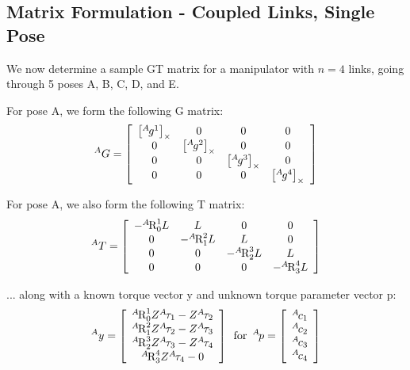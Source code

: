 \documentclass[letterpaper,12pt]{article}
\newcommand{\R}[2]{{\mbox{R}}^{#1}_{#2}}
\newcommand{\p}[1]{{}^{#1}\hspace{-.1em}}
\newcommand{\onevec}[1]
   {\left[ \begin{array}{c} #1 \end{array} \right] }
\begin{document}
   \newpage  
   \subsection{Matrix Formulation - Coupled Links, Single Pose}
   
      We now determine a sample GT matrix for a manipulator with $n=4$
      links, going through 5 poses A, B, C, D, and E.
      
      For pose A, we form the following G matrix:
      \begin{equation}
         {}^AG =
         \left[ \begin{array}{cccc}
            \left[ \p{A}g^1 \right]_{\times} & 0 & 0 & 0 \\
            0 & \left[ \p{A}g^2 \right]_{\times} & 0 & 0 \\
            0 & 0 & \left[ \p{A}g^3 \right]_{\times} & 0 \\
            0 & 0 & 0 & \left[ \p{A}g^4 \right]_{\times}
         \end{array} \right]
      \end{equation}
      
      \noindent
      For pose A, we also form the following T matrix:
      \begin{equation}
         {}^AT =
         \left[ \begin{array}{cccc}
            - \p{A}\R{1}{0} L &   L &  0 &  0 \\
             0 &  - \p{A}\R{2}{1} L &  L &  0 \\
             0 &  0 &  - \p{A}\R{3}{2} L &  L \\
             0 &  0 &  0 &  - \p{A}\R{4}{3} L
         \end{array} \right]
      \end{equation}
      
      \noindent
      ... along with a known torque vector y and
      unknown torque parameter vector p:
      \begin{equation}
         {}^Ay =
         \left[ \begin{array}{c}
            \p{A}\R{1}{0} Z \p{A}\tau_1 - Z \p{A}\tau_{2} \\
            \p{A}\R{2}{1} Z \p{A}\tau_2 - Z \p{A}\tau_{3} \\
            \p{A}\R{3}{2} Z \p{A}\tau_3 - Z \p{A}\tau_{4} \\
            \p{A}\R{4}{3} Z \p{A}\tau_4 - 0
         \end{array} \right]
         \,\,\,\mbox{for}\,\,\,
         \p{A}p = \onevec{ \p{A}c_1 \\ \p{A}c_2 \\ \p{A}c_3 \\ \p{A}c_4 }
      \end{equation}
      
\end{document}
